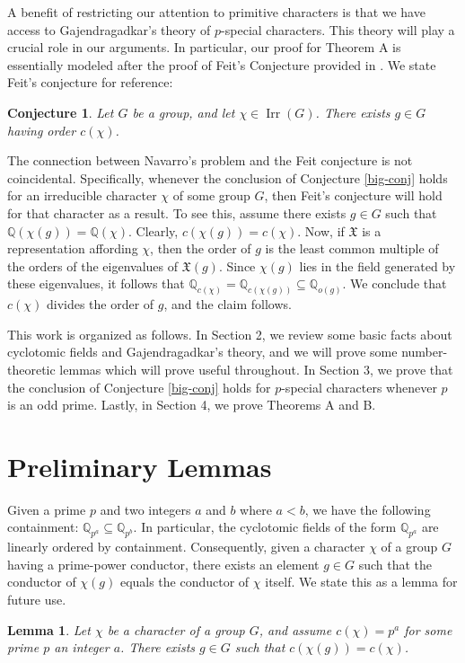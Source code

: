 \documentclass[12pt]{amsart}
\newtheorem{lemma}[theorem]{Lemma}
\newtheorem{conjecture}[theorem]{Conjecture}
\theoremstyle{definition}
\newcommand{\Q}{\mathbb{Q}}
\DeclareMathOperator{\Irr}{Irr}
\begin{document}
A benefit of restricting our attention to primitive characters is that we have access to Gajendragadkar's theory of $p$-special characters. This theory will play a crucial role in our arguments. In particular, our proof for Theorem A is essentially modeled after the proof of Feit's Conjecture provided in \cite[Theorem 2.22]{Is2}. We state Feit's conjecture \cite{F80} for reference:

\begin{conjecture}
	Let $G$ be a group, and let $\chi \in \Irr(G)$. There exists $g \in G$ having order $c(\chi)$.
\end{conjecture}

The connection between Navarro's problem and the Feit conjecture is not coincidental. Specifically, whenever the conclusion of Conjecture \ref{big-conj} holds for an irreducible character $\chi$ of some group $G$, then Feit's conjecture will hold for that character as a result. To see this, assume there exists $g \in G$ such that $\Q(\chi(g)) = \Q(\chi)$. Clearly, $c(\chi(g)) = c(\chi)$. Now, if $\mathfrak{X}$ is a representation affording $\chi$, then the order of $g$ is the least common multiple of the orders of the eigenvalues of $\mathfrak{X}(g)$. Since $\chi(g)$ lies in the field generated by these eigenvalues, it follows that $\Q_{c(\chi)} = \Q_{c(\chi(g))} \subseteq \Q_{o(g)}$. We conclude that $c(\chi)$ divides the order of $g$, and the claim follows.

This work is organized as follows. In Section 2, we review some basic facts about cyclotomic fields and Gajendragadkar's theory, and we will prove some number-theoretic lemmas which will prove useful throughout. In Section 3, we prove that the conclusion of Conjecture \ref{big-conj} holds for $p$-special characters whenever $p$ is an odd prime. Lastly, in Section 4, we prove Theorems A and B. 

\section{Preliminary Lemmas}

Given a prime $p$ and two integers $a$ and $b$ where $a < b$, we have the following containment: $\Q_{p^a}\subseteq \Q_{p^b}$. In particular, the cyclotomic fields of the form $\Q_{p^a}$ are linearly ordered by containment. Consequently, given a character $\chi$ of a group $G$ having a prime-power conductor, there exists an element $g \in G$ such that the conductor of $\chi(g)$ equals the conductor of $\chi$ itself. We state this as a lemma for future use.
\begin{lemma}\label{L:2:1}
	Let $\chi$ be a character of a group $G$, and assume $c(\chi) = p^a$ for some prime $p$ an integer $a$. There exists $g \in G$ such that $c(\chi(g)) = c(\chi)$.
\end{lemma}
\end{document}
